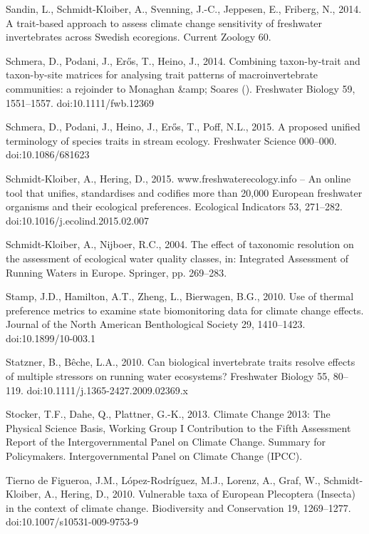 \begin{thebibliography}
\bibitem{} \hangindent=1cm Sandin, L., Schmidt-Kloiber, A., Svenning, J.-C., Jeppesen, E., Friberg, N., 2014. A trait-based approach to assess climate change sensitivity of freshwater invertebrates across Swedish ecoregions. Current Zoology 60.

\bibitem{} \hangindent=1cm Schmera, D., Podani, J., Erős, T., Heino, J., 2014. Combining taxon-by-trait and taxon-by-site matrices for analysing trait patterns of macroinvertebrate communities: a rejoinder to Monaghan &amp; Soares (). Freshwater Biology 59, 1551–1557. doi:10.1111/fwb.12369

\bibitem{} \hangindent=1cm Schmera, D., Podani, J., Heino, J., Erős, T., Poff, N.L., 2015. A proposed unified terminology of species traits in stream ecology. Freshwater Science 000–000. doi:10.1086/681623

\bibitem{} \hangindent=1cm Schmidt-Kloiber, A., Hering, D., 2015. www.freshwaterecology.info – An online tool that unifies, standardises and codifies more than 20,000 European freshwater organisms and their ecological preferences. Ecological Indicators 53, 271–282. doi:10.1016/j.ecolind.2015.02.007

\bibitem{} \hangindent=1cm Schmidt-Kloiber, A., Nijboer, R.C., 2004. The effect of taxonomic resolution on the assessment of ecological water quality classes, in: Integrated Assessment of Running Waters in Europe. Springer, pp. 269–283.

\bibitem{} \hangindent=1cm Stamp, J.D., Hamilton, A.T., Zheng, L., Bierwagen, B.G., 2010. Use of thermal preference metrics to examine state biomonitoring data for climate change effects. Journal of the North American Benthological Society 29, 1410–1423. doi:10.1899/10-003.1

\bibitem{} \hangindent=1cm Statzner, B., Bêche, L.A., 2010. Can biological invertebrate traits resolve effects of multiple stressors on running water ecosystems? Freshwater Biology 55, 80–119. doi:10.1111/j.1365-2427.2009.02369.x

\bibitem{} \hangindent=1cm Stocker, T.F., Dahe, Q., Plattner, G.-K., 2013. Climate Change 2013: The Physical Science Basis, Working Group I Contribution to the Fifth Assessment Report of the Intergovernmental Panel on Climate Change. Summary for Policymakers. Intergovernmental Panel on Climate Change (IPCC).

\bibitem{} \hangindent=1cm Tierno de Figueroa, J.M., López-Rodríguez, M.J., Lorenz, A., Graf, W., Schmidt-Kloiber, A., Hering, D., 2010. Vulnerable taxa of European Plecoptera (Insecta) in the context of climate change. Biodiversity and Conservation 19, 1269–1277. doi:10.1007/s10531-009-9753-9


\end{thebibliography}
